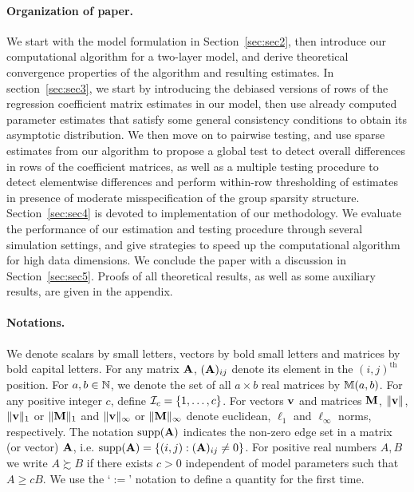 \paragraph{Organization of paper.}
We start with the model formulation in Section~\ref{sec:sec2}, then introduce our computational algorithm for a two-layer model, and derive theoretical convergence properties of the algorithm and resulting estimates. In section~\ref{sec:sec3}, we start by introducing the debiased versions of rows of the regression coefficient matrix estimates in our model, then use already computed parameter estimates that satisfy some general consistency conditions to obtain its asymptotic distribution. We then move on to pairwise testing, and use sparse estimates from our algorithm to propose a global test to detect overall differences in rows of the coefficient matrices, as well as a multiple testing procedure to detect elementwise differences and perform within-row thresholding of estimates in presence of moderate misspecification of the group sparsity structure. Section~\ref{sec:sec4} is devoted to implementation of our methodology. We evaluate the performance of our estimation and testing procedure through several simulation settings, and give strategies to speed up the computational algorithm for high data dimensions.  We conclude the paper with a discussion in Section~\ref{sec:sec5}. Proofs of all theoretical results, as well as some auxiliary results, are given in the appendix.

\paragraph{Notations.}
We denote scalars by small letters, vectors by bold small letters and matrices by bold capital letters. For any matrix ${\mathbf{A}}$, $({\mathbf{A}})_{ij}$ denote its element in the $(i,j)^\text{th}$ position. For $a,b \in {\mathbb{N}}$, we denote the set of all $a \times b$ real matrices by ${\mathbb{M}}(a,b)$. For any positive integer $c$, define ${\cal{I}}_c = \{ 1, \ldots, c\}$. For vectors ${\bf{v}}$ and matrices ${\mathbf{M}}$, $\| {\bf{v}} \|$, $\|{\bf{v}} \|_1$ or $\|{\mathbf{M}} \|_1$ and $\|{\bf{v}} \|_\infty$ or $\|{\mathbf{M}} \|_\infty$ denote euclidean, $\ell_1$ and $\ell_\infty$ norms, respectively. The notation $\operatorname*{supp}({\mathbf{A}})$ indicates the non-zero edge set in a matrix (or vector) ${\mathbf{A}}$, i.e. $\operatorname*{supp}({\mathbf{A}}) = \{(i,j): ({\mathbf{A}})_{ij} \neq 0\}$. For positive real numbers $A, B$ we write $A \succsim B$ if there exists $c>0$ independent of model parameters such that $A \geq cB$. We use the `$:=$' notation to define a quantity for the first time.